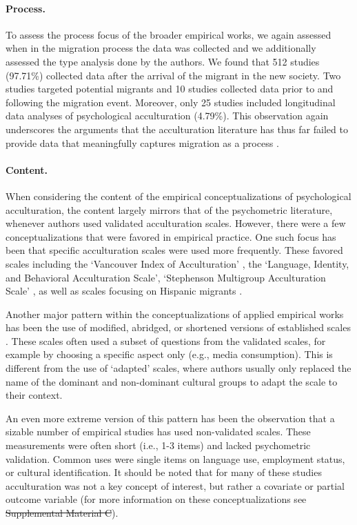 \documentclass[man, 12pt, a4paper, mask]{apa7}
\newcommand{\siannotatedanalyses}{Supplemental Material B} %
\providecommand{\DIFaddtex}[1]{{\protect\color{blue}\uwave{#1}}} %
\providecommand{\DIFdeltex}[1]{{\protect\color{red}\sout{#1}}}                      %
\providecommand{\DIFaddbegin}{} %
\providecommand{\DIFaddend}{} %
\providecommand{\DIFdelbegin}{} %
\providecommand{\DIFdelend}{} %
\providecommand{\DIFadd}[1]{\texorpdfstring{\DIFaddtex{#1}}{#1}} %
\providecommand{\DIFdel}[1]{\texorpdfstring{\DIFdeltex{#1}}{}} %
\newcommand{\DIFscaledelfig}{0.5}
\newlength{\DIFdelgraphicswidth} %
\newlength{\DIFdelgraphicsheight} %
\newcommand{\DIFaddincludegraphics}[2][]{{\color{blue}\fbox{\DIFOincludegraphics[#1]{#2}}}} %
\newcommand{\DIFdelincludegraphics}[2][]{%
\sbox{\DIFdelgraphicsbox}{\DIFOincludegraphics[#1]{#2}}%
\settoboxwidth{\DIFdelgraphicswidth}{\DIFdelgraphicsbox} %
\settoboxtotalheight{\DIFdelgraphicsheight}{\DIFdelgraphicsbox} %
\scalebox{\DIFscaledelfig}{%
\parbox[b]{\DIFdelgraphicswidth}{\usebox{\DIFdelgraphicsbox}\\[-\baselineskip] \rule{\DIFdelgraphicswidth}{0em}}\llap{\resizebox{\DIFdelgraphicswidth}{\DIFdelgraphicsheight}{%
\setlength{\unitlength}{\DIFdelgraphicswidth}%
\begin{picture}(1,1)%
\thicklines\linethickness{2pt} %
{\color[rgb]{1,0,0}\put(0,0){\framebox(1,1){}}}%
{\color[rgb]{1,0,0}\put(0,0){\line( 1,1){1}}}%
{\color[rgb]{1,0,0}\put(0,1){\line(1,-1){1}}}%
\end{picture}%
}\hspace*{3pt}}} %
} %
\DeclareRobustCommand{\DIFaddbegin}{\DIFOaddbegin \let\includegraphics\DIFaddincludegraphics} %
\DeclareRobustCommand{\DIFaddend}{\DIFOaddend \let\includegraphics\DIFOincludegraphics} %
\DeclareRobustCommand{\DIFdelbegin}{\DIFOdelbegin \let\includegraphics\DIFdelincludegraphics} %
\DeclareRobustCommand{\DIFdelend}{\DIFOaddend \let\includegraphics\DIFOincludegraphics} %
\begin{document}
\paragraph{Process.}

To assess the process focus of the broader empirical works, we again
assessed when in the migration process the data was collected and we
additionally assessed the type analysis done by the authors. We found
that 512 studies (97.71\%) collected data after the arrival of the
migrant in the new society. Two studies targeted potential migrants and
10 studies collected data prior to and following the migration event.
Moreover, only 25 studies included longitudinal data analyses of
psychological acculturation (4.79\%). This observation again underscores
the arguments that the acculturation literature has thus far failed to
provide data that meaningfully captures migration as a process
\citep[e.g.,][]{Brown2011, Ward2019}.

\paragraph{Content.}

When considering the content of the empirical conceptualizations of
psychological acculturation, the content largely mirrors that of the
psychometric literature, whenever authors used validated acculturation
scales. However, there were a few conceptualizations that were favored
in empirical practice. One such focus has been that specific
acculturation scales were used more frequently. These favored scales
including the `Vancouver Index of Acculturation' \citep[][]{Ryder2000},
the `Language, Identity, and Behavioral Acculturation Scale',
`Stephenson Multigroup Acculturation Scale' \citep[][]{Stephenson2000},
as well as scales focusing on Hispanic migrants
\citep[][]{Cuellar1995a, Marin1987, Marin1987}.

Another major pattern within the conceptualizations of applied empirical
works has been the use of modified, abridged, or shortened versions of
established scales \citep[e.g.,][]{Green2014,Im2009}. These scales often
used a subset of questions from the validated scales, for example by
choosing a specific aspect only (e.g., media consumption). This is
different from the use of `adapted' scales, where authors usually only
replaced the name of the dominant and non-dominant cultural groups to
adapt the scale to their context.

An even more extreme version of this pattern has been the observation
that a sizable number of empirical studies has used non-validated
scales. These measurements were often short (i.e., 1-3 items) and lacked
psychometric validation. Common uses were single items on language use,
employment status, or cultural identification. It should be noted that
for many of these studies acculturation was not a key concept of
interest, but rather a covariate or partial outcome variable (for more
information on these conceptualizations see \DIFdelbegin \DIFdel{Supplemental Material C}\DIFdelend \DIFaddbegin \DIFadd{\siannotatedanalyses}\DIFaddend ).
\end{document}
